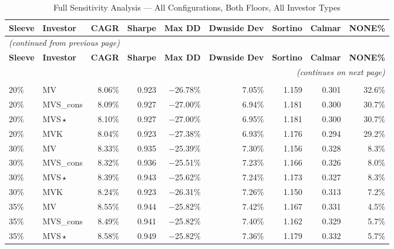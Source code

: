 \documentclass[12pt, a4paper]{article}
\begin{document}
\setlength{\tabcolsep}{4pt}
\footnotesize
\begin{longtable}{llrrrrrrr}
\caption{Full Sensitivity Analysis --- All Configurations, Both Floors, All Investor Types}
\label{tab:sensitivity_full} \\
\toprule
\textbf{Sleeve} & \textbf{Investor} & \textbf{CAGR} & \textbf{Sharpe} & \textbf{Max DD} & \textbf{Dwnside Dev} & \textbf{Sortino} & \textbf{Calmar} & \textbf{NONE\%} \\
\midrule
\endfirsthead
\multicolumn{9}{l}{\footnotesize\textit{(continued from previous page)}} \\[2pt]
\toprule
\textbf{Sleeve} & \textbf{Investor} & \textbf{CAGR} & \textbf{Sharpe} & \textbf{Max DD} & \textbf{Dwnside Dev} & \textbf{Sortino} & \textbf{Calmar} & \textbf{NONE\%} \\
\midrule
\endhead
\midrule
\multicolumn{9}{r}{\footnotesize\textit{(continues on next page)}} \\
\endfoot
\bottomrule
\endlastfoot
\multicolumn{9}{l}{\textbf{Score improvement floor = 0.001}} \\[2pt]
20\% & MV           & 8.06\% & 0.923 & $-$26.78\% & 7.05\% & 1.159 & 0.301 & 32.6\% \\
20\% & MVS\_cons    & 8.09\% & 0.927 & $-$27.00\% & 6.94\% & 1.181 & 0.300 & 30.7\% \\
20\% & MVS\,$\star$ & 8.10\% & 0.927 & $-$27.00\% & 6.95\% & 1.181 & 0.300 & 30.7\% \\
20\% & MVK          & 8.04\% & 0.923 & $-$27.38\% & 6.93\% & 1.176 & 0.294 & 29.2\% \\[3pt]
30\% & MV           & 8.33\% & 0.935 & $-$25.39\% & 7.30\% & 1.156 & 0.328 &  8.3\% \\
30\% & MVS\_cons    & 8.32\% & 0.936 & $-$25.51\% & 7.23\% & 1.166 & 0.326 &  8.0\% \\
30\% & MVS\,$\star$ & 8.39\% & 0.943 & $-$25.62\% & 7.24\% & 1.173 & 0.327 &  8.3\% \\
30\% & MVK          & 8.24\% & 0.923 & $-$26.31\% & 7.26\% & 1.150 & 0.313 &  7.2\% \\[3pt]
35\% & MV           & 8.55\% & 0.944 & $-$25.82\% & 7.42\% & 1.167 & 0.331 &  4.5\% \\
35\% & MVS\_cons    & 8.49\% & 0.941 & $-$25.82\% & 7.40\% & 1.162 & 0.329 &  5.7\% \\
35\% & MVS\,$\star$ & 8.58\% & 0.949 & $-$25.82\% & 7.36\% & 1.179 & 0.332 &  5.7\% \\

\end{longtable}
\end{document}
